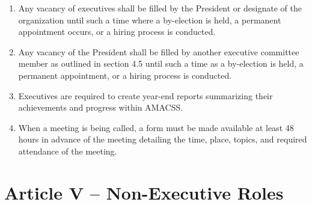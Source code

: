 \documentclass[12pt,a4paper]{article}
\begin{document}
\begin{enumerate}
\item Any vacancy of executives shall be filled by the President or designate of the organization until such a time where a by-election is held, a permanent appointment occurs, or a hiring process is conducted.

\item Any vacancy of the President shall be filled by another executive committee member as outlined in section 4.5 until such a time as a by-election is held, a permanent appointment, or a hiring process is conducted.

\item Executives are required to create year-end reports summarizing their achievements and progress within AMACSS.

\item When a meeting is being called, a form must be made available at least 48 hours in advance of the meeting detailing the time, place, topics, and required attendance of the meeting.
\end{enumerate}

\section*{Article V – Non-Executive Roles}
\end{document}
